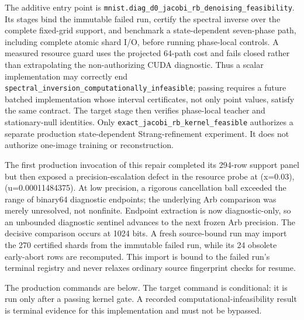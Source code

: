 \documentclass[11pt]{article}
\numberwithin{equation}{section}
\newcommand{\1}{\mathbf 1}
\begin{document}
The additive entry point is
\nolinkurl{mnist.diag_d0_jacobi_rb_denoising_feasibility}.  Its stages bind
the immutable failed run, certify the spectral inverse over the complete
fixed-grid support, and benchmark a state-dependent seven-phase path,
including complete atomic shard I/O, before running phase-local controls.  A
measured resource guard uses the projected 64-path cost and fails closed
rather than extrapolating the non-authorizing CUDA diagnostic.  Thus a scalar
implementation may correctly end
\nolinkurl{spectral_inversion_computationally_infeasible}; passing requires a
future batched implementation whose interval certificates, not only point
values, satisfy the same contract.  The target stage then verifies phase-local
teacher and stationary-null identities.  Only
\nolinkurl{exact_jacobi_rb_kernel_feasible} authorizes a separate production
state-dependent Strang-refinement experiment.  It does not authorize
one-image training or reconstruction.

The first production invocation of this repair completed its 294-row support
panel but then exposed a precision-escalation defect in the resource probe at
(x=0.03), (u=0.00011484375).  At low precision, a rigorous cancellation
ball exceeded the range of binary64 diagnostic endpoints; the underlying Arb
comparison was merely unresolved, not nonfinite.  Endpoint extraction is now
diagnostic-only, so an unbounded diagnostic sentinel advances to the next
frozen Arb precision.  The decisive comparison occurs at 1024 bits.  A fresh
source-bound run may import the 270 certified shards from the immutable failed
run, while its 24 obsolete early-abort rows are recomputed.  This import is
bound to the failed run's terminal registry and never relaxes ordinary source
fingerprint checks for resume.

The production commands are below.  The target command is conditional: it is
run only after a passing kernel gate.  A recorded computational-infeasibility
result is terminal evidence for this implementation and must not be bypassed.
\end{document}
